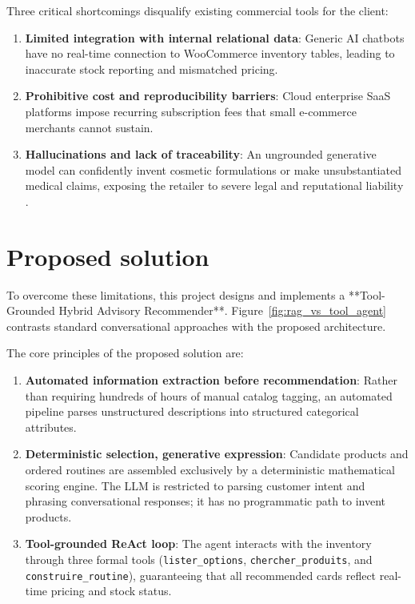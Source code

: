 Three critical shortcomings disqualify existing commercial tools for the client:
\begin{enumerate}
  \item \textbf{Limited integration with internal relational data}: Generic AI chatbots have no real-time connection to WooCommerce inventory tables, leading to inaccurate stock reporting and mismatched pricing.
  \item \textbf{Prohibitive cost and reproducibility barriers}: Cloud enterprise SaaS platforms impose recurring subscription fees that small e-commerce merchants cannot sustain.
  \item \textbf{Hallucinations and lack of traceability}: An ungrounded generative model can confidently invent cosmetic formulations or make unsubstantiated medical claims, exposing the retailer to severe legal and reputational liability \cite{ji2023survey}.
\end{enumerate}

\section{Proposed solution}

To overcome these limitations, this project designs and implements a **Tool-Grounded Hybrid Advisory Recommender**. Figure~\ref{fig:rag_vs_tool_agent} contrasts standard conversational approaches with the proposed architecture.


The core principles of the proposed solution are:
\begin{enumerate}
  \item \textbf{Automated information extraction before recommendation}: Rather than requiring hundreds of hours of manual catalog tagging, an automated pipeline parses unstructured descriptions into structured categorical attributes.
  \item \textbf{Deterministic selection, generative expression}: Candidate products and ordered routines are assembled exclusively by a deterministic mathematical scoring engine. The LLM is restricted to parsing customer intent and phrasing conversational responses; it has no programmatic path to invent products.
  \item \textbf{Tool-grounded ReAct loop}: The agent interacts with the inventory through three formal tools (\texttt{lister\_options}, \texttt{chercher\_produits}, and \texttt{construire\_routine}), guaranteeing that all recommended cards reflect real-time pricing and stock status.
\end{enumerate}

